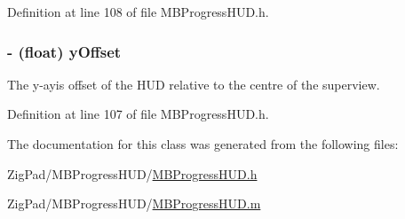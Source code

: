 Definition at line 108 of file MBProgressHUD.h.

\hypertarget{interface_m_b_progress_h_u_d_a5193d79f9884fd5dad21aa7981429d16}{
\subsubsection[{yOffset}]{\setlength{\rightskip}{0pt plus 5cm}-\/ (float) yOffset}}
\label{interface_m_b_progress_h_u_d_a5193d79f9884fd5dad21aa7981429d16}
The y-\/ayis offset of the HUD relative to the centre of the superview. 

Definition at line 107 of file MBProgressHUD.h.



The documentation for this class was generated from the following files:\begin{DoxyCompactItemize}
\item 
ZigPad/MBProgressHUD/\hyperlink{_m_b_progress_h_u_d_8h}{MBProgressHUD.h}\item 
ZigPad/MBProgressHUD/\hyperlink{_m_b_progress_h_u_d_8m}{MBProgressHUD.m}\end{DoxyCompactItemize}
